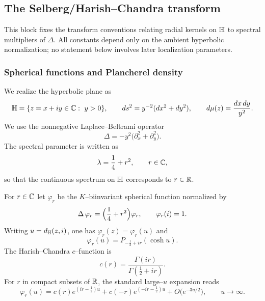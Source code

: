 %

\subsection{The Selberg/Harish--Chandra transform}\label{subsec:selberg-transform}

This block fixes the transform conventions relating radial kernels on $\mathbb{H}$
to spectral multipliers of $\Delta$. All constants depend only on the
ambient hyperbolic normalization; no statement below involves later
localization parameters.

\subsubsection{Spherical functions and Plancherel density}\label{subsec:spherical-functions}

We realize the hyperbolic plane as
\[
\mathbb{H}=\{z=x+iy\in\mathbb{C}:\ y>0\},
\qquad
ds^{2}=y^{-2}(dx^{2}+dy^{2}),
\qquad
d\mu(z)=\frac{dx\,dy}{y^{2}}.
\]
We use the nonnegative Laplace--Beltrami operator
\begin{equation}\label{eq:laplace-Hh}
\Delta=-y^{2}\bigl(\partial_{x}^{2}+\partial_{y}^{2}\bigr).
\end{equation}
The spectral parameter is written as
\[
\lambda=\frac14+r^{2},\qquad r\in\mathbb{C},
\]
so that the continuous spectrum on $\mathbb{H}$ corresponds to $r\in\mathbb{R}$.

For $r\in\mathbb{C}$ let $\varphi_{r}$ be the $K$--biinvariant spherical function normalized by
\begin{equation}\label{eq:spherical-eig}
\Delta\,\varphi_{r}=\Bigl(\frac14+r^{2}\Bigr)\varphi_{r},
\qquad
\varphi_{r}(i)=1.
\end{equation}
Writing $u=d_{\mathbb{H}}(z,i)$, one has $\varphi_{r}(z)=\varphi_{r}(u)$ and
\begin{equation}\label{eq:spherical-legendre}
\varphi_{r}(u)=P_{-\frac12+ir}(\cosh u).
\end{equation}
The Harish--Chandra $c$--function is
\begin{equation}\label{eq:c-function}
c(r)=\frac{\Gamma(ir)}{\Gamma(\frac12+ir)}.
\end{equation}
For $r$ in compact subsets of $\mathbb{R}$, the standard large--$u$ expansion reads
\begin{equation}\label{eq:spherical-asymp}
\varphi_{r}(u)
=
c(r)e^{(ir-\frac12)u}
+
c(-r)e^{(-ir-\frac12)u}
+
O\!\bigl(e^{-3u/2}\bigr),
\qquad u\to\infty.
\end{equation}

